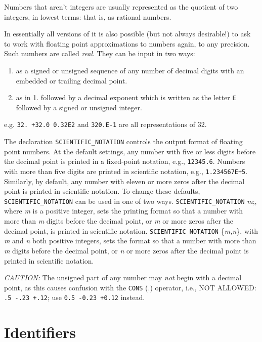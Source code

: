 Numbers that aren't integers are usually represented as the quotient of
two integers, in lowest terms: that is, as rational numbers.

In essentially all versions of {\REDUCE} it is also possible (but not always
desirable!) to ask {\REDUCE} to work with floating point approximations to
numbers again, to any precision. Such numbers are called {\em real}.
  They can be input in two ways:
\begin{enumerate}
\item as a signed or unsigned sequence of any number of decimal digits
      with an embedded or trailing decimal point.
\item as in 1. followed by a decimal exponent which is written as the
      letter {\tt E} followed by a signed or unsigned integer.
\end{enumerate}
e.g. {\tt 32. +32.0 0.32E2} and {\tt 320.E-1} are all representations of
32.

The declaration {\tt SCIENTIFIC\_NOTATION}
controls the output format of floating point numbers.  At
the default settings, any number with five or less digits before the
decimal point is printed in a fixed-point notation, e.g., {\tt 12345.6}.
Numbers with more than five digits are printed in scientific notation,
e.g., {\tt 1.234567E+5}.  Similarly, by default, any number with eleven or
more zeros after the decimal point is printed in scientific notation.  To
change these defaults, {\tt SCIENTIFIC\_NOTATION} can be used in one of two
ways. {\tt SCIENTIFIC\_NOTATION} {\em m};, where {\em m\/} is a positive
integer, sets the printing format so that a number with more than {\em m\/}
digits before the decimal point, or {\em m\/} or more zeros after the
decimal point, is printed in scientific notation. {\tt SCIENTIFIC\_NOTATION}
\{{\em m,n}\}, with {\em m\/} and {\em n\/} both positive integers, sets the
format so that a number with more than {\em m\/} digits before the decimal
point, or {\em n\/} or more zeros after the decimal point is printed in
scientific notation.

{\it CAUTION:}  The unsigned part of any number may {\em not\/}
begin with a decimal point, as this causes confusion with the {\tt CONS} (.)
operator, i.e., NOT ALLOWED: {\tt .5  -.23  +.12};
use {\tt 0.5 -0.23 +0.12} instead.

\section{Identifiers}

